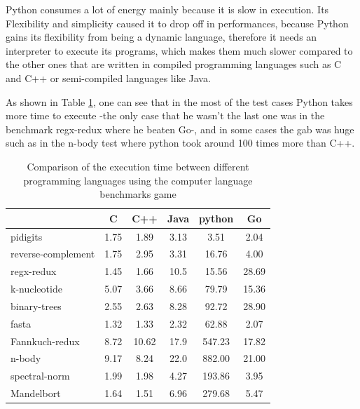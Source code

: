 Python consumes a lot of energy mainly because it is slow in execution. Its Flexibility and simplicity caused it to drop off in performances, because Python gains its flexibility from being a dynamic language, therefore it needs an interpreter to execute its programs, which makes them much slower compared to the other ones that are written in compiled programming languages such as C and C++ or semi-compiled languages like Java.

As shown in Table \ref{fig:clbg}, one can see that in the most of the test cases Python takes more time to execute -the only case that he wasn't the last one was in the benchmark regx-redux where he beaten Go-, and in some cases the gab was huge such as in the n-body test where python took around 100 times more than C++.

\begin{table}[hbt]
    \begin{tabular}{l|*{5}c}
                           & C    & C++   & Java & python & Go    \\
        \hline
        pidigits           & 1.75 & 1.89  & 3.13 & 3.51   & 2.04  \\
        reverse-complement & 1.75 & 2.95  & 3.31 & 16.76  & 4.00  \\
        regx-redux         & 1.45 & 1.66  & 10.5 & 15.56  & 28.69 \\
        k-nucleotide       & 5.07 & 3.66  & 8.66 & 79.79  & 15.36 \\
        binary-trees       & 2.55 & 2.63  & 8.28 & 92.72  & 28.90 \\
        fasta              & 1.32 & 1.33  & 2.32 & 62.88  & 2.07  \\
        Fannkuch-redux     & 8.72 & 10.62 & 17.9 & 547.23 & 17.82 \\
        n-body             & 9.17 & 8.24  & 22.0 & 882.00 & 21.00 \\
        spectral-norm      & 1.99 & 1.98  & 4.27 & 193.86 & 3.95  \\
        Mandelbort         & 1.64 & 1.51  & 6.96 & 279.68 & 5.47
    \end{tabular}
    \caption{Comparison of the execution time between different programming languages using the computer language benchmarks game \cite{noauthor_which_nodate}}
    \label{fig:clbg}
\end{table}



